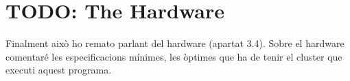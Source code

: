 
\section{TODO: The Hardware}
\label{sec:hardware}

Finalment això ho remato parlant del hardware (apartat 3.4). Sobre el hardware
comentaré les especificacions mínimes, les òptimes que ha de tenir el cluster
que executi aquest programa.
